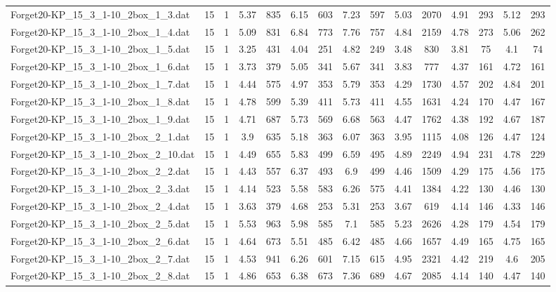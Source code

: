 \begin{table}[!ht]
{\begin{tabular}{lcccccccccccccc}
Forget20-KP\_15\_3\_1-10\_2box\_1\_3.dat & 15 & 1 & 5.37 & 835 & 6.15 & 603 & 7.23 & 597 & 5.03 & 2070 & 4.91 & 293 & 5.12 & 293 \\
Forget20-KP\_15\_3\_1-10\_2box\_1\_4.dat & 15 & 1 & 5.09 & 831 & 6.84 & 773 & 7.76 & 757 & 4.84 & 2159 & 4.78 & 273 & 5.06 & 262 \\
Forget20-KP\_15\_3\_1-10\_2box\_1\_5.dat & 15 & 1 & 3.25 & 431 & 4.04 & 251 & 4.82 & 249 & 3.48 & 830 & 3.81 & 75 & 4.1 & 74 \\
Forget20-KP\_15\_3\_1-10\_2box\_1\_6.dat & 15 & 1 & 3.73 & 379 & 5.05 & 341 & 5.67 & 341 & 3.83 & 777 & 4.37 & 161 & 4.72 & 161 \\
Forget20-KP\_15\_3\_1-10\_2box\_1\_7.dat & 15 & 1 & 4.44 & 575 & 4.97 & 353 & 5.79 & 353 & 4.29 & 1730 & 4.57 & 202 & 4.84 & 201 \\
Forget20-KP\_15\_3\_1-10\_2box\_1\_8.dat & 15 & 1 & 4.78 & 599 & 5.39 & 411 & 5.73 & 411 & 4.55 & 1631 & 4.24 & 170 & 4.47 & 167 \\
Forget20-KP\_15\_3\_1-10\_2box\_1\_9.dat & 15 & 1 & 4.71 & 687 & 5.73 & 569 & 6.68 & 563 & 4.47 & 1762 & 4.38 & 192 & 4.67 & 187 \\
Forget20-KP\_15\_3\_1-10\_2box\_2\_1.dat & 15 & 1 & 3.9 & 635 & 5.18 & 363 & 6.07 & 363 & 3.95 & 1115 & 4.08 & 126 & 4.47 & 124 \\
Forget20-KP\_15\_3\_1-10\_2box\_2\_10.dat & 15 & 1 & 4.49 & 655 & 5.83 & 499 & 6.59 & 495 & 4.89 & 2249 & 4.94 & 231 & 4.78 & 229 \\
Forget20-KP\_15\_3\_1-10\_2box\_2\_2.dat & 15 & 1 & 4.43 & 557 & 6.37 & 493 & 6.9 & 499 & 4.46 & 1509 & 4.29 & 175 & 4.56 & 175 \\
Forget20-KP\_15\_3\_1-10\_2box\_2\_3.dat & 15 & 1 & 4.14 & 523 & 5.58 & 583 & 6.26 & 575 & 4.41 & 1384 & 4.22 & 130 & 4.46 & 130 \\
Forget20-KP\_15\_3\_1-10\_2box\_2\_4.dat & 15 & 1 & 3.63 & 379 & 4.68 & 253 & 5.31 & 253 & 3.67 & 619 & 4.14 & 146 & 4.33 & 146 \\
Forget20-KP\_15\_3\_1-10\_2box\_2\_5.dat & 15 & 1 & 5.53 & 963 & 5.98 & 585 & 7.1 & 585 & 5.23 & 2626 & 4.28 & 179 & 4.54 & 179 \\
Forget20-KP\_15\_3\_1-10\_2box\_2\_6.dat & 15 & 1 & 4.64 & 673 & 5.51 & 485 & 6.42 & 485 & 4.66 & 1657 & 4.49 & 165 & 4.75 & 165 \\
Forget20-KP\_15\_3\_1-10\_2box\_2\_7.dat & 15 & 1 & 4.53 & 941 & 6.26 & 601 & 7.15 & 615 & 4.95 & 2321 & 4.42 & 219 & 4.6 & 205 \\
Forget20-KP\_15\_3\_1-10\_2box\_2\_8.dat & 15 & 1 & 4.86 & 653 & 6.38 & 673 & 7.36 & 689 & 4.67 & 2085 & 4.14 & 140 & 4.47 & 140 \\

\end{tabular}}
\end{table}
